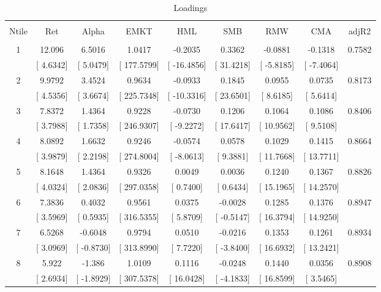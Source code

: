 \documentclass[16pt]{article}
\begin{document}
\begin{table}[!htbp] \centering 
  \caption{Loadings} 
  \label{} 
\begin{tabular}{@{\extracolsep{5pt}} ccccccccc} 
\\[-1.8ex]\hline 
\hline \\[-1.8ex] 
Ntile & Ret & Alpha & EMKT & HML & SMB & RMW & CMA & adjR2 \\ 
\hline \\[-1.8ex] 
1 & 12.096 & 6.5016 & 1.0417 & -0.2035 & 0.3362 & -0.0881 & -0.1318 & 0.7582 \\ 
 & [ 4.6342] & [ 5.0479] & [ 177.5799] & [ -16.4856] & [ 31.4218] & [ -5.8185] & [ -7.4064] &  \\ 
2 & 9.9792 & 3.4524 & 0.9634 & -0.0933 & 0.1845 & 0.0955 & 0.0735 & 0.8173 \\ 
 & [ 4.5356] & [ 3.6674] & [ 225.7348] & [ -10.3316] & [ 23.6501] & [ 8.6185] & [ 5.6414] &  \\ 
3 & 7.8372 & 1.4364 & 0.9228 & -0.0730 & 0.1206 & 0.1064 & 0.1086 & 0.8406 \\ 
 & [ 3.7988] & [ 1.7358] & [ 246.9307] & [ -9.2272] & [ 17.6417] & [ 10.9562] & [ 9.5108] &  \\ 
4 & 8.0892 & 1.6632 & 0.9246 & -0.0574 & 0.0578 & 0.1029 & 0.1415 & 0.8664 \\ 
 & [ 3.9879] & [ 2.2198] & [ 274.8004] & [ -8.0613] & [ 9.3881] & [ 11.7668] & [ 13.7711] &  \\ 
5 & 8.1648 & 1.4364 & 0.9326 & 0.0049 & 0.0036 & 0.1240 & 0.1367 & 0.8826 \\ 
 & [ 4.0324] & [ 2.0836] & [ 297.0358] & [ 0.7400] & [ 0.6434] & [ 15.1965] & [ 14.2570] &  \\ 
6 & 7.3836 & 0.4032 & 0.9561 & 0.0375 & -0.0028 & 0.1285 & 0.1376 & 0.8947 \\ 
 & [ 3.5969] & [ 0.5935] & [ 316.5355] & [ 5.8709] & [ -0.5147] & [ 16.3794] & [ 14.9250] &  \\ 
7 & 6.5268 & -0.6048 & 0.9794 & 0.0510 & -0.0216 & 0.1353 & 0.1261 & 0.8934 \\ 
 & [ 3.0969] & [ -0.8730] & [ 313.8990] & [ 7.7220] & [ -3.8400] & [ 16.6932] & [ 13.2421] &  \\ 
8 & 5.922 & -1.386 & 1.0109 & 0.1116 & -0.0248 & 0.1440 & 0.0356 & 0.8908 \\ 
 & [ 2.6934] & [ -1.8929] & [ 307.5378] & [ 16.0428] & [ -4.1833] & [ 16.8599] & [ 3.5465] &  \\ 

\end{tabular}
\end{table}
\end{document}
